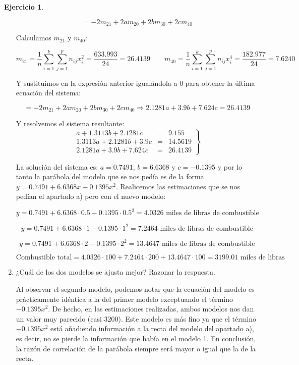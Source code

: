 \documentclass[a4paper, 12pt]{article}
\theoremstyle{definition}
\newtheorem{ej}{Ejercicio}
\begin{document}
\begin{ej}
\begin{enumerate}[label=\alph*)]
\[
   = -2m_{21}+2am_{20}+2bm_{30}+2cm_{40}
\]

Calculamos $m_{21}$ y $m_{40}$:

\[
    m_{21} = \frac{1}{n}\sum_{i=1}^{k}\sum_{j=1}^{p}n_{ij}x_{i}^{2} = \frac{633.993}{24} = 26.4139 \qquad m_{40} = \frac{1}{n}\sum_{i=1}^{k}\sum_{j=1}^{p}n_{ij}x_{i}^{4} = \frac{182.977}{24} = 7.6240
\]

Y sustituimos en la expresión anterior igualándola a 0 para obtener la última ecuación del sistema:

\[
    = -2m_{21}+2am_{20}+2bm_{30}+2cm_{40} \Rightarrow 2.1281a+3.9b+7.624c = 26.4139
\]

Y resolvemos el sistema resultante:
\[
\left.
\begin{array}{rcl}
     a+1.3113b+2.1281c&=&9.155
  \\ 1.3113a+2.1281b+3.9c&=&14.5619
  \\ 2.1281a+3.9b+7.624c &=& 26.4139
\end{array}
\right\}
\]

La solución del sistema es: $a=0.7491$, $b=6.6368$ y $c=-0.1395$ y por lo tanto la parábola del modelo que se nos pedía es de la forma $y=0.7491+6.6368x-0.1395x^2$. Realicemos las estimaciones que se nos pedían el apartado a) pero con el nuevo modelo:

\[
    y = 0.7491+6.6368 \cdot 0.5 -0.1395 \cdot 0.5^2 = 4.0326 \text{ miles de libras de combustible}
\]

\[
    y = 0.7491+6.6368 \cdot 1 -0.1395 \cdot 1^2 =  7.2464\text{ miles de libras de combustible}
\]

\[
    y = 0.7491+6.6368 \cdot 2 -0.1395 \cdot 2^2 =  13.4647 \text{ miles de libras de combustible}
\]

\[
    \text{Combustible total} = 4.0326 \cdot 100 + 7.2464 \cdot 200 + 13.4647 \cdot 100 = 3199.01 \text{ miles de libras}
\]

\item ¿Cuál de los dos modelos se ajusta mejor? Razonar la respuesta.

Al observar el segundo modelo, podemos notar que la ecuación del modelo es prácticamente idéntica a la del primer modelo exceptuando el término $-0.1395x^2$. De hecho, en las estimaciones realizadas, ambos modelos nos dan un valor muy parecido (casi 3200). Este modelo es más fino ya que el término $-0.1395x^2$ está añadiendo información a la recta del modelo del apartado a), es decir, no se pierde la información que había en el modelo 1. En conclusión, la razón de correlación de la parábola siempre será mayor o igual que la de la recta.

\end{enumerate}
\end{ej}
\end{document}
